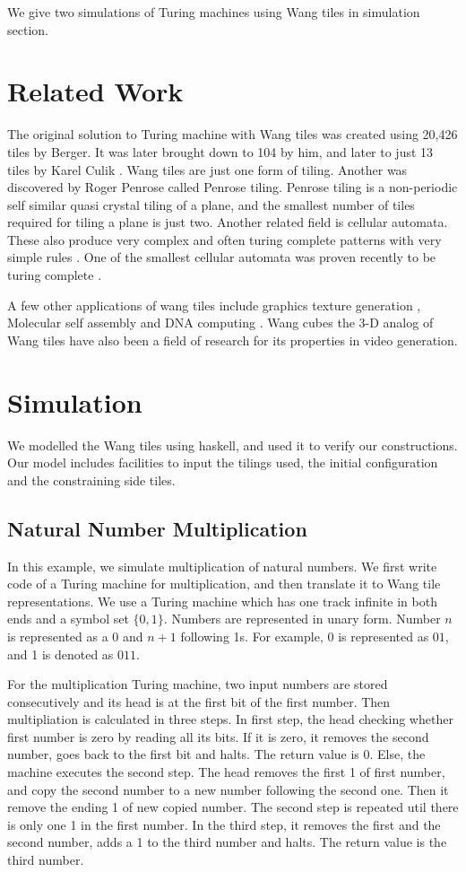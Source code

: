 \documentclass{article}
\begin{document}
We give two simulations of Turing machines using Wang tiles in simulation section.

\section*{Related Work}
The original solution to Turing machine with Wang tiles was created using 20,426 tiles by Berger. It was later brought down to 104 by him, and later to just 13 tiles by Karel Culik \cite{culik}. Wang tiles are just one form of tiling. Another was discovered by Roger Penrose called Penrose tiling. Penrose tiling \cite{penrose} is a non-periodic self similar quasi crystal tiling of a plane, and the smallest number of tiles required for tiling a plane is just two. Another related field is cellular automata. These also produce very complex and often turing complete patterns with very simple rules \cite{wolfram}. One of the smallest cellular automata was proven recently to be turing complete \cite{cook}.

A few other applications of wang tiles include graphics texture generation \cite{texture}, Molecular self assembly \cite{assembly} and DNA computing \cite{dna}. Wang cubes \cite{cubes} the 3-D analog of Wang tiles have also been a field of research for its properties in video generation.

\section*{Simulation}
We modelled the Wang tiles using haskell, and used it to verify our constructions. Our model includes facilities to input the tilings used, the initial configuration and the constraining side tiles. 

\subsection*{Natural Number Multiplication}
In this example, we simulate multiplication of natural numbers. We first write code of a Turing machine for multiplication, and then translate it to Wang tile representations. We use a Turing machine which has one track infinite in both ends and a symbol set $\{0, 1\}$. Numbers are represented in unary form. Number $n$ is represented as a $0$ and $n + 1$ following 1s. For example, 0 is represented as $01$, and 1 is denoted as $011$. 

For the multiplication Turing machine, two input numbers are stored consecutively and its head is at the first bit of the first number. Then multipliation is calculated in three steps. In first step, the head checking whether first number is zero by reading all its bits. If it is zero, it removes the second number, goes back to the first bit and halts. The return value is 0. Else, the machine executes the second step. The head removes the first 1 of first number, and copy the second number to a new number following the second one. Then it remove the ending 1 of new copied number. The second step is repeated util there is only one 1 in the first number. In the third step, it removes the first and the second number, adds a 1 to the third number and halts. The return value is the third number. 
\end{document}
